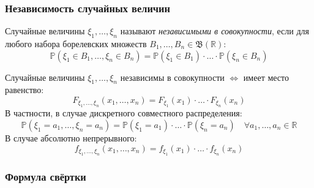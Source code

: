 \subsubsection{Независимость случайных величин}
\begin{defn}
    Случайные величины $\xi_1, \ldots, \xi_n$ называют {\it независимыми в совокупности}, если для любого набора борелевских множеств $B_{1}, \ldots, B_{n} \in \mathfrak{B}(\mathbb{R})$:
    \begin{equation*}
        \mathbb{P}\left(\xi_{1} \in B_{1}, \ldots, \xi_{n} \in B_{n}\right)=\mathbb{P}\left(\xi_{1} \in B_{1}\right) \cdot \ldots \cdot \mathbb{P}\left(\xi_{n} \in B_{n}\right)
    \end{equation*}
\end{defn}
\begin{namedthm}
    Случайные величины $\xi_1, \ldots, \xi_n$ независимы в совокупности $\Leftrightarrow$ имеет место равенство:
    \begin{equation*}
        F_{\xi_{1}, \ldots, \xi_{n}}\left(x_{1}, \ldots, x_{n}\right)=F_{\xi_{1}}\left(x_{1}\right) \cdot \ldots \cdot F_{\xi_{n}}\left(x_{n}\right)
    \end{equation*}
    В частности, в случае дискретного совместного распределения:
    \begin{equation*}
        \mathbb{P}\left(\xi_{1}=a_{1}, \ldots, \xi_{n}=a_{n}\right)=\mathbb{P}\left(\xi_{1}=a_{1}\right) \cdot \ldots \cdot \mathbb{P}\left(\xi_{n}=a_{n}\right) \quad \forall a_1, \ldots, a_n \in \mathbb{R}
    \end{equation*}
    В случае абсолютно непрерывного:
    \begin{equation*}
        f_{\xi_{1}, \ldots, \xi_{n}}\left(x_{1}, \ldots, x_{n}\right)=f_{\xi_{1}}\left(x_{1}\right) \cdot \ldots \cdot f_{\xi_{n}}\left(x_{n}\right)
    \end{equation*}
\end{namedthm}

\subsubsection{Формула свёртки}

